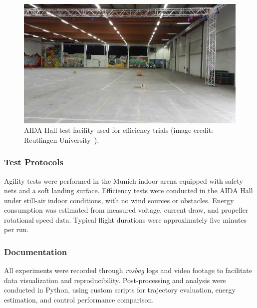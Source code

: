 \begin{figure}[h]
\centering
\includegraphics[width=0.85\linewidth]{figures/aida_hall.jpg}
\caption{AIDA Hall test facility used for efficiency trials (image credit: Reutlingen University~\cite{AIDAHallPhoto2024}).}
\label{fig:aida_hall}
\end{figure}

\subsubsection{Test Protocols}
Agility tests were performed in the Munich indoor arena equipped with safety nets and a soft landing surface.  
Efficiency tests were conducted in the AIDA Hall under still-air indoor conditions, with no wind sources or obstacles.  
Energy consumption was estimated from measured voltage, current draw, and propeller rotational speed data.  
Typical flight durations were approximately five minutes per run.

\subsubsection{Documentation}
All experiments were recorded through \textit{rosbag} logs and video footage to facilitate data visualization and reproducibility.  
Post-processing and analysis were conducted in Python, using custom scripts for trajectory evaluation, energy estimation, and control performance comparison.

